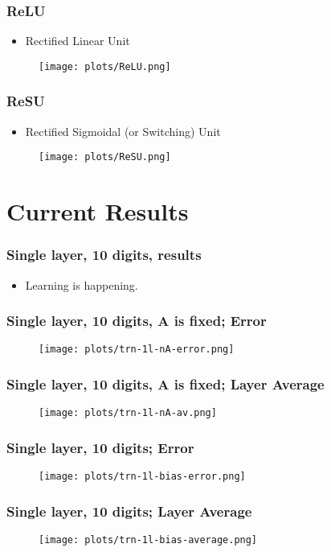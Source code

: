\documentclass{beamer}
\begin{document}
\begin{frame}
	\frametitle{ReLU}
	\begin{itemize}
		\item Rectified Linear Unit
	\end{itemize}
	\begin{figure}
		\texttt{[image: plots/ReLU.png]}
	\end{figure}
\end{frame}
\begin{frame}
	\frametitle{ReSU}
	\begin{itemize}
		\item Rectified Sigmoidal (or Switching) Unit
	\end{itemize}
	\begin{figure}
		\texttt{[image: plots/ReSU.png]}
	\end{figure}
\end{frame}
	
\section{Current Results}

\begin{frame}
	\frametitle{Single layer, 10 digits, results}
	\begin{itemize}
		\item Learning is happening.
	\end{itemize}
\end{frame}
\begin{frame}
	\frametitle{Single layer, 10 digits, A is fixed; Error}
	\begin{figure}
		\texttt{[image: plots/trn-1l-nA-error.png]}
	\end{figure}
\end{frame}
\begin{frame}
	\frametitle{Single layer, 10 digits, A is fixed; Layer Average}
	\begin{figure}
		\texttt{[image: plots/trn-1l-nA-av.png]}
	\end{figure}
\end{frame}
\begin{frame}
	\frametitle{Single layer, 10 digits; Error}
	\begin{figure}
		\texttt{[image: plots/trn-1l-bias-error.png]}
	\end{figure}
\end{frame}
\begin{frame}
	\frametitle{Single layer, 10 digits; Layer Average}
	\begin{figure}
		\texttt{[image: plots/trn-1l-bias-average.png]}
	\end{figure}
\end{frame}
\end{document}
